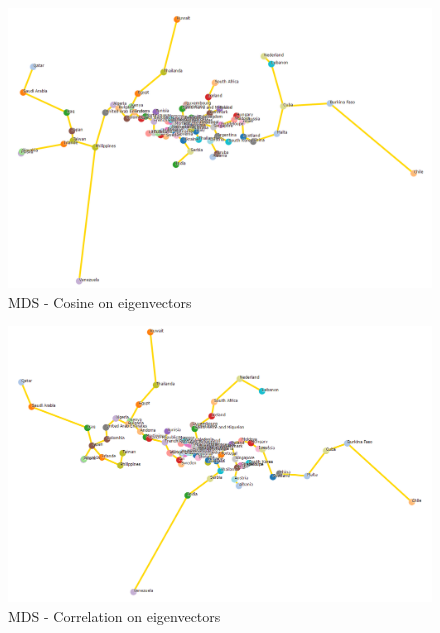 \documentclass[11pt]{article}
\begin{document}
\begin{figure}[!htp]
\centering
\includegraphics[width=\textwidth]{../vis/country.eigens.vis.mds.cosine.png}
\caption{MDS - Cosine on eigenvectors}
\label{fig:mdsCosineEigenvectorsFigure}
\end{figure}

\begin{figure}[!htp]
\centering
\includegraphics[width=\textwidth]{../vis/country.eigens.vis.mds.correlation.png}
\caption{MDS - Correlation on eigenvectors}
\label{fig:mdsCorrelationEigenvectorsFigure}
\end{figure}
\end{document}
